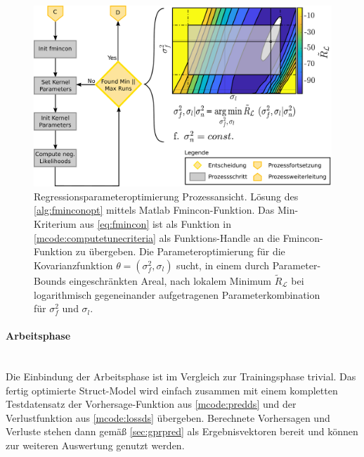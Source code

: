 \vspace{5mm}
\begin{figure}[bph]
	\centering
	\includegraphics[width=\linewidth]{chapters/images/3-SW-E-OExp/Kernel_Tuning}
	\caption[Regressionsparameteroptimierung Prozessansicht]{Regressionsparameteroptimierung Prozessansicht. Lösung des \autoref{alg:fminconopt} mittels Matlab Fmincon-Funktion. Das Min-Kriterium aus \autoref{eq:fmincon} ist als Funktion in \autoref{mcode:computetunecriteria} als Funktions-Handle an die Fmincon-Funktion zu übergeben. Die Parameteroptimierung für die Kovarianzfunktion $\theta = (\sigma_f^2,\sigma_l)$ sucht, in einem durch Parameter-Bounds eingeschränkten Areal, nach lokalem Minimum $\tilde{R}_{\mathcal{L}}$ bei logarithmisch gegeneinander aufgetragenen Parameterkombination für $\sigma_f^2$ und $\sigma_l$.}
	\label{fig:kerneltuning}
\end{figure}


\clearpage


\paragraph{Arbeitsphase}\label{par:gpr-work-pro}$~$\\


Die Einbindung der Arbeitsphase ist im Vergleich zur Trainingsphase trivial. Das fertig optimierte Struct-Model wird einfach zusammen mit einem kompletten Testdatensatz der Vorhersage-Funktion aus \autoref{mcode:predds} und der Verlustfunktion aus \autoref{mcode:lossds} übergeben. Berechnete Vorhersagen und Verluste stehen dann gemäß \autoref{sec:gprpred} als Ergebnisvektoren bereit und können zur weiteren Auswertung genutzt werden.


